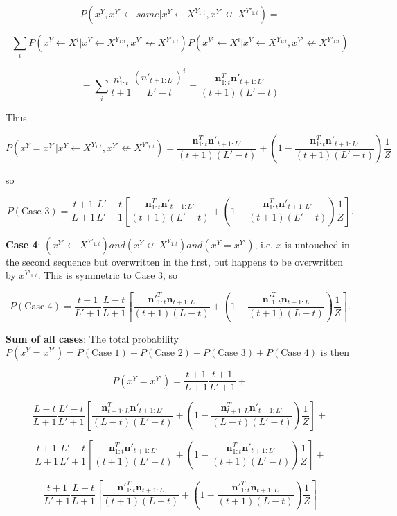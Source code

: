 \documentclass{article}
\begin{document}
$$P(x^Y, x^{Y'} \leftarrow same|x^Y \leftarrow X^{Y_{1:t}}, x^{Y'} \not\leftarrow X^{Y'_{1:t}}) = $$

$$\sum_i P(x^Y \leftarrow X^i|x^Y \leftarrow X^{Y_{1:t}}, x^{Y'} \not\leftarrow X^{Y'_{1:t}})P(x^{Y'} \leftarrow X^i|x^Y \leftarrow X^{Y_{1:t}}, x^{Y'} \not\leftarrow X^{Y'_{1:t}})$$

$$= \sum_i \frac{n^i_{1:t}}{t+1} \frac{(n'_{t+1:L'})^i}{L'-t} = \frac{\mathbf{n}^T_{1:t}\mathbf{n}'_{t+1:L'}}{(t+1)(L'-t)}$$

Thus

$$P(x^Y = x^{Y'}|x^Y \leftarrow X^{Y_{1:t}}, x^{Y'} \not\leftarrow X^{Y'_{1:t}}) = \frac{\mathbf{n}^T_{1:t}\mathbf{n}'_{t+1:L'}}{(t+1)(L'-t)} + \left(1 - \frac{\mathbf{n}^T_{1:t}\mathbf{n}'_{t+1:L'}}{(t+1)(L'-t)}\right)\frac{1}{Z}$$

so 

$$P(\textrm{Case 3}) = \frac{t+1}{L+1}\frac{L'-t}{L'+1}\left[\frac{\mathbf{n}^T_{1:t}\mathbf{n}'_{t+1:L'}}{(t+1)(L'-t)} + \left(1 - \frac{\mathbf{n}^T_{1:t}\mathbf{n}'_{t+1:L'}}{(t+1)(L'-t)}\right)\frac{1}{Z}\right].$$

\textbf{Case 4}: $(x^{Y'} \leftarrow X^{Y'_{1:t}}) and (x^Y \not\leftarrow X^{Y_{1:t}}) and (x^Y = x^{Y'})$, i.e. $x$ is untouched in the second sequence but overwritten in the first, but happens to be overwritten by $x^{Y'_{1:t}}$. This is symmetric to Case 3, so 

$$P(\textrm{Case 4}) = \frac{t+1}{L'+1}\frac{L-t}{L+1}\left[\frac{\mathbf{n}'^T_{1:t}\mathbf{n}_{t+1:L}}{(t+1)(L-t)} + \left(1 - \frac{\mathbf{n}'^T_{1:t}\mathbf{n}_{t+1:L}}{(t+1)(L-t)}\right)\frac{1}{Z}\right].$$

\textbf{Sum of all cases}: The total probability $P(x^Y = x^{Y'}) = P(\textrm{Case 1}) + P(\textrm{Case 2}) + P(\textrm{Case 3}) + P(\textrm{Case 4})$ is then

$$P(x^Y = x^{Y'}) = \frac{t+1}{L+1}\frac{t+1}{L'+1} + $$

$$\frac{L-t}{L+1}\frac{L'-t}{L'+1}\left[\frac{\mathbf{n}^T_{t+1:L}\mathbf{n}'_{t+1:L'}}{(L-t)(L'-t)} + \left(1 - \frac{\mathbf{n}^T_{t+1:L}\mathbf{n}'_{t+1:L'}}{(L-t)(L'-t)} \right)\frac{1}{Z}\right] + $$

$$\frac{t+1}{L+1}\frac{L'-t}{L'+1}\left[\frac{\mathbf{n}^T_{1:t}\mathbf{n}'_{t+1:L'}}{(t+1)(L'-t)} + \left(1 - \frac{\mathbf{n}^T_{1:t}\mathbf{n}'_{t+1:L'}}{(t+1)(L'-t)}\right)\frac{1}{Z}\right] + $$

$$\frac{t+1}{L'+1}\frac{L-t}{L+1}\left[\frac{\mathbf{n}'^T_{1:t}\mathbf{n}_{t+1:L}}{(t+1)(L-t)} + \left(1 - \frac{\mathbf{n}'^T_{1:t}\mathbf{n}_{t+1:L}}{(t+1)(L-t)}\right)\frac{1}{Z}\right]$$
\end{document}
